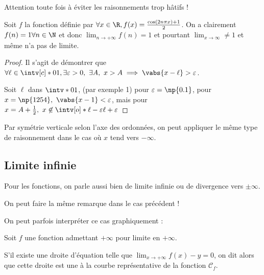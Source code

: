 \documentclass[12pt,a4paper,frenchb]{article}
\begin{document}
Attention toute fois à éviter les raisonnements trop hâtifs !
\begin{exemple}
  Soit $f$ la fonction définie par $\forall x\in\R, f(x) = \frac{\cos(2n\pi x)
  +1 }{2}$. On a clairement $f(n) = 1 \forall n \in\N$ et donc
  $\lim_{n\to+\infty}f(n) = 1$ et pourtant $\lim_{x\to\infty} \neq 1$ et
  même n'a pas de limite.
  \begin{proof}
    Il s'agit de démontrer que $\forall \ell \in \intv[c]*{0}{1},\exists
    \varepsilon > 0,\ \exists A,\ x > A \implies \vabs{x - \ell} >
    \varepsilon$.

    Soit $\ell$ dans $\intv*{0}{1}$, (par exemple 1) pour $\varepsilon =
    \np{0.1}$, pour $x = \np{1254},\ \vabs{x - 1} < \varepsilon$, mais
    pour $x = A + \frac12,\ x\not\in \intv[o]*{\ell - \varepsilon}{\ell +
    \varepsilon}$
  \end{proof}
\end{exemple}

Par symétrie verticale selon l'axe des ordonnées, on peut appliquer le
même type de raisonnement dans le cas où $x$ tend vers $-\infty$.


\subsection{Limite infinie}

Pour les fonctions, on parle aussi bien de limite infinie ou de
divergence vers $\pm\infty$.


On peut faire la même remarque dans le cas précédent !

On peut parfois interpréter ce cas graphiquement :

\begin{minipage}{0.99\linewidth}
  Soit $f$ une fonction admettant $+\infty$ pour limite en $+\infty$.

  S'il existe une droite d'équation \hspace{2cm} telle que
  $\lim_{x\to+\infty}f(x) - y = 0$, on dit alors que cette droite est
  une \vspace{9mm}\hspace{6cm} à la courbe représentative de la fonction
  $\mathscr{C}_f$.
\end{minipage}
\end{document}
